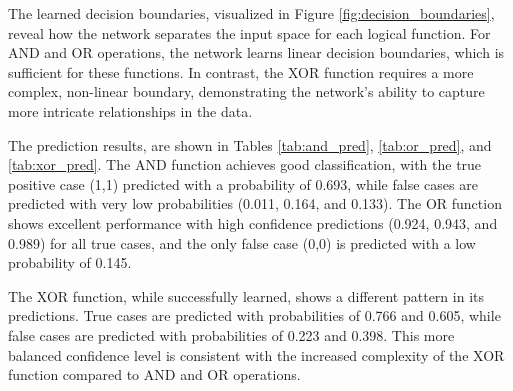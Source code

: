 \documentclass[11pt,a4paper]{article}
\begin{document}
The learned decision boundaries, visualized in Figure \ref{fig:decision_boundaries}, reveal how the network separates the input space for each logical function. For AND and OR operations, the network learns linear decision boundaries, which is sufficient for these functions. In contrast, the XOR function requires a more complex, non-linear boundary, demonstrating the network's ability to capture more intricate relationships in the data.

The prediction results, are shown in Tables \ref{tab:and_pred}, \ref{tab:or_pred}, and \ref{tab:xor_pred}. The AND function achieves good classification, with the true positive case (1,1) predicted with a probability of 0.693, while false cases are predicted with very low probabilities (0.011, 0.164, and 0.133). The OR function shows excellent performance with high confidence predictions (0.924, 0.943, and 0.989) for all true cases, and the only false case (0,0) is predicted with a low probability of 0.145.

The XOR function, while successfully learned, shows a different pattern in its predictions. True cases are predicted with probabilities of 0.766 and 0.605, while false cases are predicted with probabilities of 0.223 and 0.398. This more balanced confidence level is consistent with the increased complexity of the XOR function compared to AND and OR operations.
\end{document}
